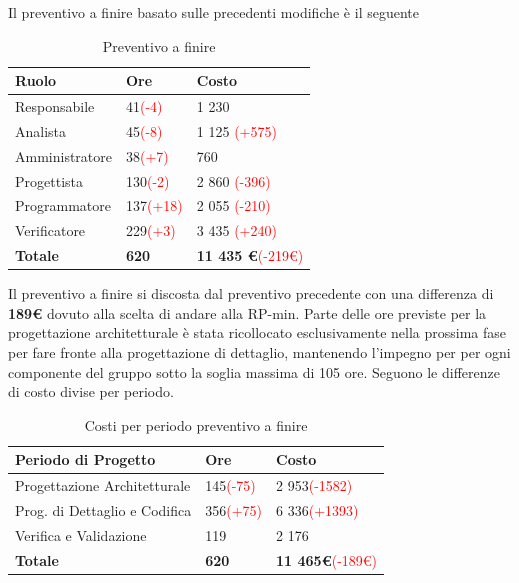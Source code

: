 \documentclass[a4paper,11pt]{article}
\begin{document}
		Il preventivo a finire basato sulle precedenti modifiche è il seguente
		
		\begin{table}[h!]
		\begin{center}
			\begin{tabular}{l l l}
			\textbf{Ruolo} & \textbf{Ore} & \textbf{Costo}\\
			\midrule
				Responsabile & 41\textcolor{red}{(-4)} & 1 230\\
				Analista & 45\textcolor{red}{(-8)} & 1 125 \textcolor{red}{(+575)}\\
				Amministratore & 38\textcolor{red}{(+7)} & 760\\
				Progettista & 130\textcolor{red}{(-2)} & 2 860 \textcolor{red}{(-396)}\\
				Programmatore & 137\textcolor{red}{(+18)} & 2 055 \textcolor{red}{(-210)}\\
				Verificatore & 229\textcolor{red}{(+3)} & 3 435 \textcolor{red}{(+240)}\\
			\midrule
			\textbf{Totale} & \textbf{620} & \textbf{11 435 \euro}\textcolor{red}{(-219\euro)}
			\end{tabular}
		\end{center}
			\caption{Preventivo a finire}
		\end{table}
		
		Il preventivo a finire si discosta dal preventivo precedente con una differenza di \textbf{189\euro} dovuto alla scelta di andare alla RP-min\addglos. Parte delle ore previste per la progettazione architetturale è  stata ricollocato esclusivamente nella prossima fase per fare fronte alla progettazione di dettaglio, mantenendo l'impegno per per ogni componente del gruppo sotto la soglia massima di 105 ore. Seguono le differenze di costo divise per periodo.
		
		\begin{table}[h!]
	\begin{center}
		\begin{tabular}{l l l}
			\textbf{Periodo di Progetto} & \textbf{Ore} & \textbf{Costo}\\
			\midrule
			Progettazione Architetturale & 145\textcolor{red}{(-75)} & 2 953\textcolor{red}{(-1582)} \\
			Prog. di Dettaglio e Codifica & 356\textcolor{red}{(+75)} & 6 336\textcolor{red}{(+1393)} \\
			Verifica e Validazione & 119 & 2 176\\
			\midrule
			\textbf{Totale} & \textbf{620} & \textbf{11 465\euro}\textcolor{red}{(-189\euro)}
		\end{tabular} 
		\end{center}
	\caption{Costi per periodo preventivo a finire}
	\end{table}	
		
\end{document}
